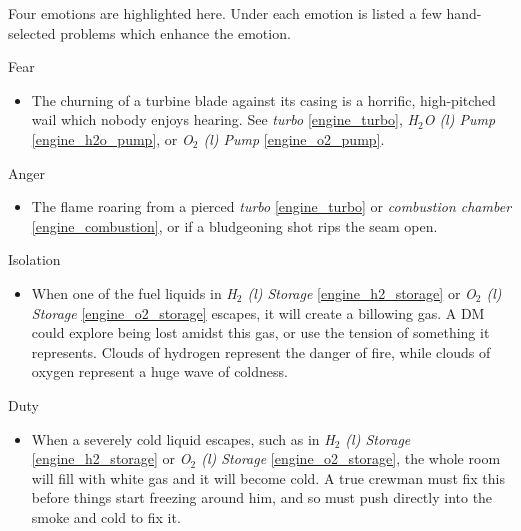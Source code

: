 \documentclass[a4paper]{article}
\begin{document}
Four emotions are highlighted here. Under each emotion is listed a few hand-selected problems which enhance the emotion.

\vspace{0.3cm}
\begin{minipage}[t]{0.4\linewidth}
Fear
\begin{itemize}
\item The churning of a turbine blade against its casing is a horrific, high-pitched wail which nobody enjoys hearing. See \textit{turbo} \ref{engine_turbo}, \textit{H$_2$O (l) Pump} \ref{engine_h2o_pump}, or \textit{O$_2$ (l) Pump} \ref{engine_o2_pump}.
\end{itemize}
\end{minipage} 
\begin{minipage}[t]{0.4\linewidth}
Anger
\begin{itemize}
\item The flame roaring from a pierced \textit{turbo} \ref{engine_turbo} or \textit{combustion chamber} \ref{engine_combustion}, or if a bludgeoning shot rips the seam open. 
\end{itemize}
\end{minipage}

\begin{minipage}[t]{0.4\linewidth}
Isolation
\begin{itemize}
\item When one of the fuel liquids in \textit{H$_2$ (l) Storage} \ref{engine_h2_storage} or \textit{O$_2$ (l) Storage} \ref{engine_o2_storage} escapes, it will create a billowing gas. A DM could explore being lost amidst this gas, or use the tension of something it represents. Clouds of hydrogen represent the danger of fire, while clouds of oxygen represent a huge wave of coldness. 
\end{itemize}
\end{minipage}
\begin{minipage}[t]{0.4\linewidth}
Duty
\begin{itemize}
\item When a severely cold liquid escapes, such as in \textit{H$_2$ (l) Storage} \ref{engine_h2_storage} or \textit{O$_2$ (l) Storage} \ref{engine_o2_storage}, the whole room will fill with white gas and it will become cold. A true crewman must fix this before things start freezing around him, and so must push directly into the smoke and cold to fix it.
\end{itemize}
\end{minipage}
 
\end{document}
